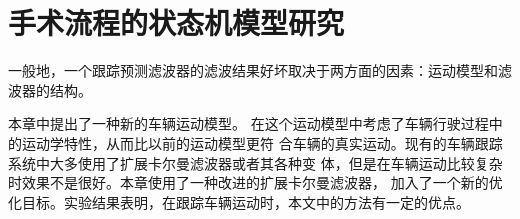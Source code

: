 \chapter{手术流程的状态机模型研究}
\label{chap8}

一般地，一个跟踪预测滤波器的滤波结果好坏取决于两方面的因素：运动模型和滤波器的结构。

本章中提出了一种新的车辆运动模型。
在这个运动模型中考虑了车辆行驶过程中的运动学特性，从而比以前的运动模型更符
合车辆的真实运动。现有的车辆跟踪系统中大多使用了扩展卡尔曼滤波器或者其各种变
体，但是在车辆运动比较复杂时效果不是很好。本章使用了一种改进的扩展卡尔曼滤波器，
加入了一个新的优化目标。实验结果表明，在跟踪车辆运动时，本文中的方法有一定的优点。 